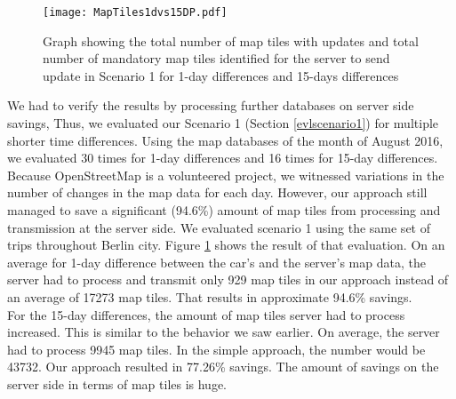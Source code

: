 \begin{figure}
\centering
\texttt{[image: MapTiles1dvs15DP.pdf]}
\caption{Graph showing the total number of map tiles with updates and total number of mandatory map tiles identified for the server to send update in Scenario 1 for 1-day differences and 15-days differences}
\label{fg:scenario11dv15d}
\end{figure}



We had to verify the results by processing further databases on server side savings, Thus, we evaluated our Scenario 1 (Section \ref{evlscenario1}) for multiple shorter time differences. Using the map databases of the month of August 2016, we evaluated 30 times for 1-day differences and 16 times for 15-day differences. Because OpenStreetMap is a volunteered project, we witnessed variations in the number of changes in the map data for each day. However, our approach still managed to save a significant (94.6\%) amount of map tiles from processing and transmission at the server side. We evaluated scenario 1 using the same set of trips throughout Berlin city. Figure \ref{fg:scenario11dv15d} shows the result of that evaluation. On an average for 1-day difference between the car's and the server's map data, the server had to process and transmit only 929 map tiles in our approach instead of an average of 17273 map tiles. That results in approximate 94.6\% savings. \\

For the 15-day differences, the amount of map tiles server had to process increased. This is similar to the behavior we saw earlier. On average, the server had to process 9945 map tiles. In the simple approach, the number would be 43732. Our approach resulted in 77.26\% savings. The amount of savings on the server side in terms of map tiles is huge. \\






